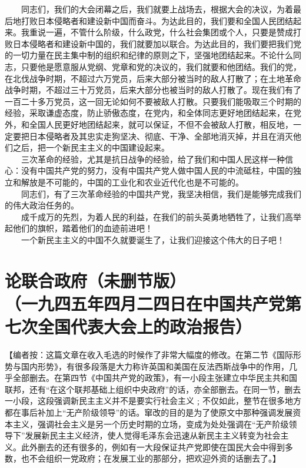 \documentclass[cn,11pt,chinese]{elegantbook}
\def\myformat#1{\hfil\hfil #1}
\begin{document}
　　同志们，我们的大会闭幕之后，我们就要上战场去，根据大会的决议，为着最后地打败日本侵略者和建设新中国而奋斗。为达此目的，我们要和全国人民团结起来。我重说一遍，不管什么阶级，什么政党，什么社会集团或个人，只要是赞成打败日本侵略者和建设新中国的，我们就要加以联合。为达此目的，我们要把我们党的一切力量在民主集中制的组织和纪律的原则之下，坚强地团结起来。不论什么同志，只要他是愿意服从党纲、党章和党的决议的，我们就要和他团结。我们的党，在北伐战争时期，不超过六万党员，后来大部分被当时的敌人打散了；在土地革命战争时期，不超过三十万党员，后来大部分也被当时的敌人打散了。现在我们有了一百二十多万党员，这一回无论如何不要被敌人打散。只要我们能吸取三个时期的经验，采取谦虚态度，防止骄傲态度，在党内，和全体同志更好地团结起来，在党外，和全国人民更好地团结起来，就可以保证，不但不会被敌人打散，相反地，一定要把日本侵略者及其忠实走狗坚决、彻底、干净、全部地消灭掉，并且在消灭他们之后，把一个新民主主义的中国建设起来。\\
　　三次革命的经验，尤其是抗日战争的经验，给了我们和中国人民这样一种信心：没有中国共产党的努力，没有中国共产党人做中国人民的中流砥柱，中国的独立和解放是不可能的，中国的工业化和农业近代化也是不可能的。\\
　　同志们，有了三次革命经验的中国共产党，我坚决相信，我们是能够完成我们的伟大政治任务的。\\
　　成千成万的先烈，为着人民的利益，在我们的前头英勇地牺牲了，让我们高举起他们的旗帜，踏着他们的血迹前进吧！\\
　　一个新民主主义的中国不久就要诞生了，让我们迎接这个伟大的日子吧！\\
\newpage\section*{\myformat{论联合政府（未删节版）}\\\myformat{（一九四五年四月二四日在中国共产党第七次全国代表大会上的政治报告）}}
\begin{introduction}\item 【编者按：这篇文章在收入毛选的时候作了非常大幅度的修改。在第二节《国际形势与国内形势》，有很多段落是大力称许英国和美国在反法西斯战争中的作用，几乎全部删去。在第四节《中国共产党的政策》，有一小段主张建立中华民主共和国联邦，还有“在这个联邦基础上组织中央政府”的话，亦全部删去。在同一节，删去一小段，这段强调新民主主义并不是要实行社会主义﹔不仅如此，整节在很多地方都在事后补加上“无产阶级领导”的话。窜改的目的是为了使原文中那种强调发展资本主义，强调社会主义是另一个历史时期的立场，变成为处处强调在“无产阶级领导下”发展新民主主义经济，使人觉得毛泽东会迅速从新民主主义转变为社会主义。此外删去的还有很多的，例如有一大段保证共产党即使在国民大会中得到多数，也不会组织一党政府；在发展工业的那部分，把欢迎外资的话删去了。】\end{introduction}
\end{document}
